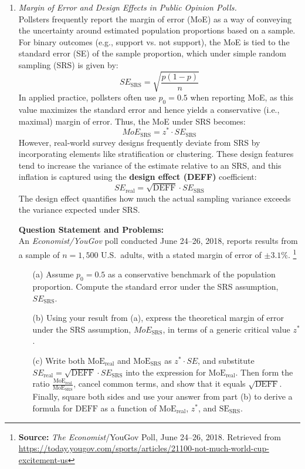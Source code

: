 \documentclass{article}
\begin{document}
\begin{enumerate}
\item  \emph{Margin of Error and Design Effects in Public Opinion Polls.}\\
    Pollsters frequently report the margin of error (MoE) as a way of conveying the uncertainty around estimated population proportions based on a sample. For binary outcomes (e.g., support vs. not support), the MoE is tied to the standard error (SE) of the sample proportion, which under simple random sampling (SRS) is given by:
    \[
    SE_{\text{SRS}} = \sqrt{\frac{p(1 - p)}{n}}
    \]
    In applied practice, pollsters often use $p_0 = 0.5$ when reporting MoE, as this value maximizes the standard error and hence yields a conservative (i.e., maximal) margin of error. Thus, the MoE under SRS becomes:
    \[
    MoE_{\text{SRS}} = z^* \cdot SE_{\text{SRS}}
    \]
    However, real-world survey designs frequently deviate from SRS by incorporating elements like stratification or clustering. These design features tend to increase the variance of the estimate relative to an SRS, and this inflation is captured using the \textbf{design effect (DEFF)} coefficient:
    \[
    SE_{\text{real}} = \sqrt{\text{DEFF}} \cdot SE_{\text{SRS}}
    \]
    The design effect quantifies how much the actual sampling variance exceeds the variance expected under SRS.
    
    \noindent\textbf{Question Statement and Problems:} \\
    An \emph{Economist/YouGov} poll conducted June 24–26, 2018, reports results from a sample of $n = 1{,}500$ U.S.\ adults, with a stated margin of error of $\pm 3.1\%$.%
    \footnote{\textbf{Source:} \emph{The Economist}/YouGov Poll, June 24–26, 2018. Retrieved from \url{https://today.yougov.com/sports/articles/21100-not-much-world-cup-excitement-us}}
    
    \begin{enumerate}
        \item[(a)] Assume $p_0 = 0.5$ as a conservative benchmark of the population proportion. Compute the standard error under the SRS assumption, $SE_{\text{SRS}}$.
    
        \item[(b)] Using your result from (a), express the theoretical margin of error under the SRS assumption, $MoE_{\text{SRS}}$, in terms of a generic critical value $z^*$.

        \item[(c)] Write both \( \text{MoE}_{\text{real}} \) and \( \text{MoE}_{\text{SRS}} \) as \( z^* \cdot SE \), and substitute \( SE_{\text{real}} = \sqrt{\text{DEFF}} \cdot SE_{\text{SRS}} \) into the expression for \( \text{MoE}_{\text{real}} \). Then form the ratio \( \frac{\text{MoE}_{\text{real}}}{\text{MoE}_{\text{SRS}}} \), cancel common terms, and show that it equals \( \sqrt{\text{DEFF}} \). Finally, square both sides and use your answer from part (b) to derive a formula for \( \text{DEFF} \) as a function of $\text{MoE}_{\text{real}}$, $z^*$, and $\text{SE}_{\text{SRS}}$.


\end{enumerate}
\end{enumerate}
\end{document}
